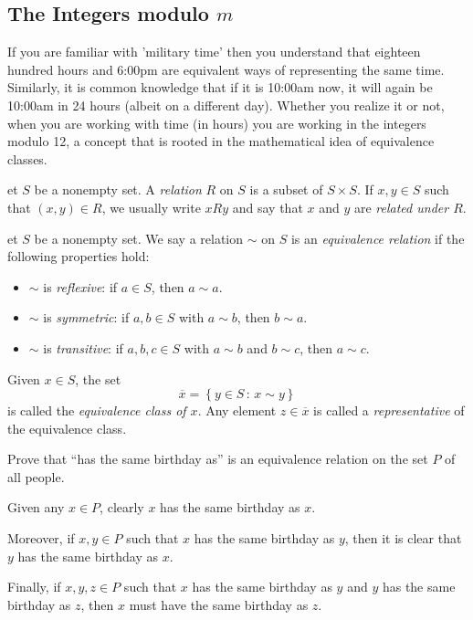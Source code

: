 \documentclass[english,course]{lecture}
\newenvironment{solution}[1][Solution]{\begin{trivlist}\pushQED{\qed}\item[\hskip \labelsep  \bfseries #1{}.\hspace{10pt}]}{\popQED\end{trivlist}}\renewcommand{\qedsymbol}{$\checkmark$}{\newenvironment{answer}{\renewcommand\qedsymbol{$\blacklozenge$}\begin{proof}[Answer]}{\end{proof}}}\newenvironment{answer}[1][Answer]{\begin{trivlist}\pushQED{\qed}\item[\hskip \labelsep  \bfseries #1{}.\hspace{10pt}]}{\popQED\end{trivlist}}\renewcommand{\qedsymbol}{$\lozenge$}
\theoremstyle{plain}
\newenvironment{definition}[1]
  {\renewcommand\theinnerdefinition{#1}\innerdefinition}
  {\endinnerdefinition}
\def\setof#1#2{{\left\{#1\,\colon\,#2\right\}}}
\def\presnotes{}
\begin{document}
\presnotes





\subsection{The Integers modulo $m$}\label{SubSec-Integers-Mod-m}

If you are familiar with 'military time' then you understand that eighteen hundred hours and 6:00pm are equivalent ways of representing the same time. Similarly, it is common knowledge that if it is 10:00am now, it will again be 10:00am in 24 hours (albeit on a different day). Whether you realize it or not, when you are working with time (in hours) you are working in the integers modulo 12, a concept that is rooted in the mathematical idea of equivalence classes.

\begin{definition}
	Let $S$ be a nonempty set.
	A \emph{relation} $R$ on $S$ is a subset of $S\times S$.
	If $x,y\in S$ such that $(x,y)\in R$, we usually write $xRy$ and say that $x$ and $y$ are \emph{related under $R$}.
\end{definition}



\begin{definition}
	Let $S$ be a nonempty set.
	We say a relation $\sim$ on $S$ is an \emph{equivalence relation} if the following properties hold:
	\begin{itemize}\renewcommand{\labelitemi}{$\diamond$}
		\item $\sim$ is \emph{reflexive}: if $a\in S$, then $a\sim a$.
		\item $\sim$ is \emph{symmetric}: if $a,b\in S$ with $a\sim b$, then $b\sim a$.
		\item $\sim$ is \emph{transitive}: if $a,b,c\in S$ with $a\sim b$ and $b\sim c$, then $a\sim c$.
	\end{itemize}
	Given $x\in S$, the set
	\[
		\overline{x} = \setof{y\in S}{x\sim y}
	\]
	is called the \emph{equivalence class of $x$}.
	Any element $z\in \overline{x}$ is called a \emph{representative} of the equivalence class.
\end{definition}

\begin{exer}
	Prove that ``has the same birthday as'' is an equivalence relation on the set $P$ of all people.
\end{exer}

\begin{solution}
	Given any $x\in P$, clearly $x$ has the same birthday as $x$.
	
	Moreover, if $x,y\in P$ such that $x$ has the same birthday as $y$, then it is clear that $y$ has the same birthday as $x$.
	
	Finally, if $x,y,z\in P$ such that $x$ has the same birthday as $y$ and $y$ has the same birthday as $z$, then $x$ must have the same birthday as $z$.
\end{solution}
\end{document}

